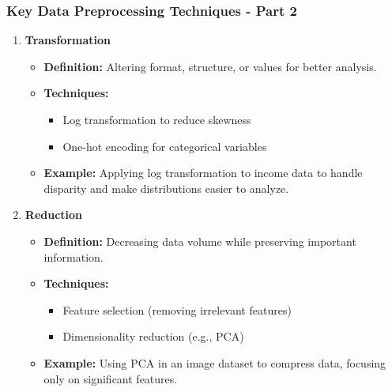 \documentclass{beamer}
\begin{document}
\begin{frame}[fragile]
    \frametitle{Key Data Preprocessing Techniques - Part 2}

    \begin{enumerate}[resume]
        \item \textbf{Transformation}
            \begin{itemize}
                \item \textbf{Definition:} Altering format, structure, or values for better analysis.
                \item \textbf{Techniques:}
                    \begin{itemize}
                        \item Log transformation to reduce skewness
                        \item One-hot encoding for categorical variables
                    \end{itemize}
                \item \textbf{Example:} Applying log transformation to income data to handle disparity and make distributions easier to analyze.
            \end{itemize}

        \item \textbf{Reduction}
            \begin{itemize}
                \item \textbf{Definition:} Decreasing data volume while preserving important information.
                \item \textbf{Techniques:}
                    \begin{itemize}
                        \item Feature selection (removing irrelevant features)
                        \item Dimensionality reduction (e.g., PCA)
                    \end{itemize}
                \item \textbf{Example:} Using PCA in an image dataset to compress data, focusing only on significant features.
            \end{itemize}
    \end{enumerate}
\end{frame}
\end{document}
